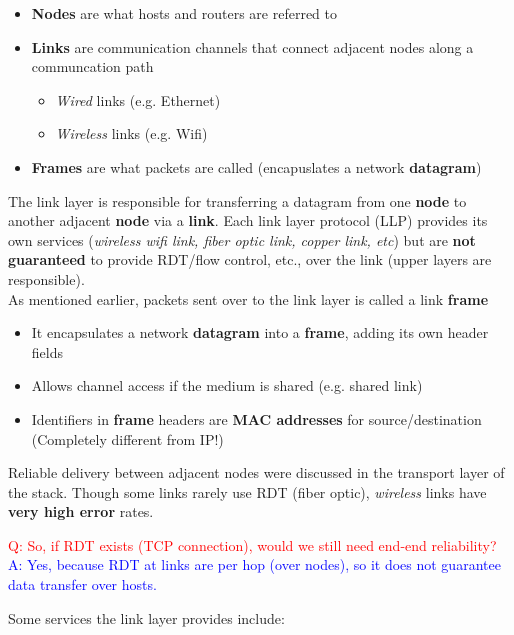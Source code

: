 \documentclass{article}
\begin{document}
\begin{itemize}
    \item \textbf{Nodes} are what hosts and routers are referred to
    \item \textbf{Links} are communication channels that connect adjacent nodes along a 
    communcation path
    \begin{itemize}
        \item \textit{Wired} links (e.g. Ethernet)
        \item \textit{Wireless} links (e.g. Wifi)
    \end{itemize}
    \item \textbf{Frames} are what packets are called (encapuslates a network \textbf{datagram})
\end{itemize}
The link layer is responsible for transferring a datagram from one \textbf{node} to another
adjacent \textbf{node} via a \textbf{link}. Each link layer protocol (LLP) provides its own 
services (\textit{wireless wifi link, fiber optic link, copper link, etc}) but are \textbf{not guaranteed} to 
provide RDT/flow control, etc., over the link (upper layers are responsible). \\
As mentioned earlier, packets sent over to the link layer is called a link \textbf{frame}
\begin{itemize}
    \item It encapsulates a network \textbf{datagram} into a \textbf{frame}, adding its own 
    header fields
    \item Allows channel access if the medium is shared (e.g. shared link)
    \item Identifiers in \textbf{frame} headers are \textbf{MAC addresses} for source/destination
    (Completely different from IP!)
\end{itemize}
Reliable delivery between adjacent nodes were discussed in the transport layer of the stack. 
Though some links rarely use RDT (fiber optic), \textit{wireless} links have \textbf{very high error} 
rates. 
\begin{center}
    \textcolor{red}{Q: So, if RDT exists (TCP connection), would we still need end-end reliability?} \\
    \textcolor{blue}{A: Yes, because RDT at links are per hop (over nodes), so it does not guarantee data
    transfer over hosts.}
\end{center}
Some services the link layer provides include:
\end{document}
